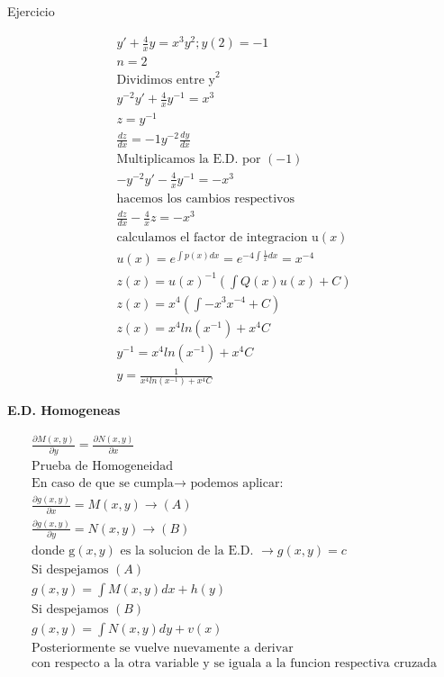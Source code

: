 \documentclass{article}
\begin{document}
Ejercicio


\begin{gather*}
y'+\frac{4}{x}y = x^{3}y^{2} ;   y(2) = -1 \\
n = 2 \\
\text{Dividimos entre y}^{2} \\
y^{-2}y'+\frac{4}{x}y^{-1} = x^{3} \\
z =y^{-1} \\
\frac{dz}{dx} = -1y^{-2}\frac{dy}{dx} \\
\text{Multiplicamos la E.D. por }(-1) \\
- y^{-2}y'-\frac{4}{x}y^{-1} = -x^{3} \\
\text{hacemos los cambios respectivos} \\
\frac{dz}{dx}-\frac{4}{x}z =-x^{3} \\
\text{calculamos el factor de integracion u}(x) \\
u(x) = e^{\int p(x)dx} = e^{-4\int \frac{1}{x}dx}=x^{-4} \\
z(x) = u(x)^{-1}(\int Q(x)u(x)+C) \\
z(x) = x^{4}(\int -x^{3}x^{-4}+C)  \\
z(x) =x^{4}ln(x^{-1})+x^{4}C \\
y^{-1} = x^{4}ln(x^{-1})+x^{4}C \\
y = \frac{1}{x^{4}ln(x^{-1})+x^{4}C}
\end{gather*}


\textbf{E.D. Homogeneas}


\begin{gather*}
\frac{\partial M(x,y)}{\partial y} = \frac{\partial N(x,y)}{\partial x} \\
\text{Prueba de Homogeneidad} \\
\text{En caso de que se cumpla} \rightarrow \text{ podemos aplicar:} \\
\frac{\partial g(x,y)}{\partial x} = M(x,y)   \rightarrow  (A) \\
\frac{\partial g(x,y)}{\partial y} = N(x,y) \rightarrow  (B) \\
\text{donde g}(x,y)\text{ es la solucion de la E.D. } \rightarrow  g(x,y) = c \\
\text{Si despejamos }(A) \\
g(x,y) =\int  M(x,y)dx + h(y) \\
\text{Si despejamos }(B) \\
g(x,y) =\int  N(x,y)dy + v(x) \\
\text{Posteriormente se vuelve nuevamente a derivar } \\
\text{con respecto a la otra variable y se iguala a la funcion respectiva cruzada}
\end{gather*}
\end{document}

